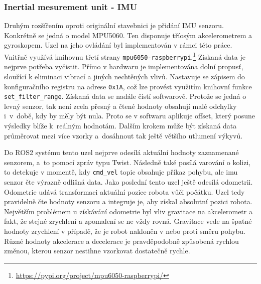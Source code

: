 \subsubsection*{Inertial mesurement unit - IMU}
Druhým rozšířením oproti originální stavebnici je přidání IMU senzoru. Konkrétně se jedná o model MPU5060. Ten disponuje tříosým akcelerometrem a gyroskopem. Uzel na jeho ovládání byl implementován v rámci této práce. Vnitřně využívá knihovnu třetí strany \verb|mpu6050-raspberrypi|.\footnote{\url{https://pypi.org/project/mpu6050-raspberrypi/}} Získaná data je nejprve potřeba vyčistit. Přímo v hardwaru je implementována dolní propusť, sloužící k eliminaci vibrací a jiných nechtěných vlivů. Nastavuje se zápisem do konfiguračního registru na adrese \verb|0x1A|, což lze provést využitím knihovní funkce \verb|set_filter_range|. Získaná data se nadále čistí softwarově. Protože se jedná o levný senzor, tak není zcela přesný a čtené hodnoty obsahují malé odchylky i~v~době, kdy by měly být nula. Proto se v softwaru aplikuje offset, který posune výsledky blíže k~reálným hodnotám. Dalším krokem může být získaná data průměrovat mezi více vzorky a~dosáhnout tak ještě většího utlumení výkyvů.

Do ROS2 systému tento uzel nejprve odesílá aktuální hodnoty zaznamenané senzorem, a~to pomocí zpráv typu Twist. Následně také posílá varování o kolizi, to detekuje v momentě, kdy \verb|cmd_vel| topic obsahuje příkaz pohybu, ale imu senzor čte výrazně odlišná data. Jako poslední tento uzel ještě odesílá odometrii. Odometrie udává transformaci aktuální pozice robota vůči počátku. Uzel tedy pravidelně čte hodnoty senzoru a integruje je, aby získal absolutní pozici robota. Největším problémem u získávání odometrie byl vliv gravitace na akcelerometr a fakt, že stejné zrychlení a zpomalení se ne vždy rovná. Gravitace vede na špatné hodnoty zrychlení v případě, že je robot nakloněn v nebo proti směru pohybu. Různé hodnoty akcelerace a decelerace je pravděpodobně způsobená rychlou změnou, kterou senzor nestihne vzorkovat dostatečně rychle.

